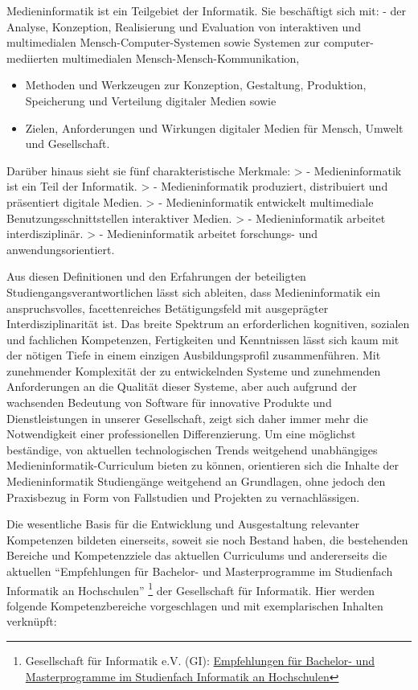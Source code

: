 \begin{siderules}
Medieninformatik ist ein Teilgebiet der Informatik. Sie beschäftigt sich
mit: - der Analyse, Konzeption, Realisierung und Evaluation von
interaktiven und multimedialen Mensch-Computer-Systemen sowie Systemen
zur computer-mediierten multimedialen Mensch-Mensch-Kommunikation,

\begin{itemize}
\tightlist
\item
  Methoden und Werkzeugen zur Konzeption, Gestaltung, Produktion,
  Speicherung und Verteilung digitaler Medien sowie
\item
  Zielen, Anforderungen und Wirkungen digitaler Medien für Mensch,
  Umwelt und Gesellschaft.
\end{itemize}
\end{siderules}

Darüber hinaus sieht sie fünf charakteristische Merkmale: \textgreater{}
- Medieninformatik ist ein Teil der Informatik. \textgreater{} -
Medieninformatik produziert, distribuiert und präsentiert digitale
Medien. \textgreater{} - Medieninformatik entwickelt multimediale
Benutzungsschnittstellen interaktiver Medien. \textgreater{} -
Medieninformatik arbeitet interdisziplinär. \textgreater{} -
Medieninformatik arbeitet forschungs- und anwendungsorientiert.

Aus diesen Definitionen und den Erfahrungen der beteiligten
Studiengangsverantwortlichen lässt sich ableiten, dass Medieninformatik
ein anspruchsvolles, facettenreiches Betätigungsfeld mit ausgeprägter
Interdisziplinarität ist. Das breite Spektrum an erforderlichen
kognitiven, sozialen und fachlichen Kompetenzen, Fertigkeiten und
Kenntnissen lässt sich kaum mit der nötigen Tiefe in einem einzigen
Ausbildungsprofil zusammenführen. Mit zunehmender Komplexität der zu
entwickelnden Systeme und zunehmenden Anforderungen an die Qualität
dieser Systeme, aber auch aufgrund der wachsenden Bedeutung von Software
für innovative Produkte und Dienstleistungen in unserer Gesellschaft,
zeigt sich daher immer mehr die Notwendigkeit einer professionellen
Differenzierung. Um eine möglichst beständige, von aktuellen
technologischen Trends weitgehend unabhängiges
Medieninformatik-Curriculum bieten zu können, orientieren sich die
Inhalte der Medieninformatik Studiengänge weitgehend an Grundlagen, ohne
jedoch den Praxisbezug in Form von Fallstudien und Projekten zu
vernachlässigen.

Die wesentliche Basis für die Entwicklung und Ausgestaltung relevanter
Kompetenzen bildeten einerseits, soweit sie noch Bestand haben, die
bestehenden Bereiche und Kompetenzziele das aktuellen Curriculums und
andererseits die aktuellen ``Empfehlungen für Bachelor- und
Masterprogramme im Studienfach Informatik an Hochschulen'' \footnote{Gesellschaft
  für Informatik e.V. (GI):
  \href{https://www.gi.de/fileadmin/redaktion/empfehlungen/GI-Empfehlungen_Bachelor-Master-Informatik2016.pdf}{Empfehlungen
  für Bachelor- und Masterprogramme im Studienfach Informatik an
  Hochschulen}} der Gesellschaft für Informatik. Hier werden folgende
Kompetenzbereiche vorgeschlagen und mit exemplarischen Inhalten
verknüpft:

